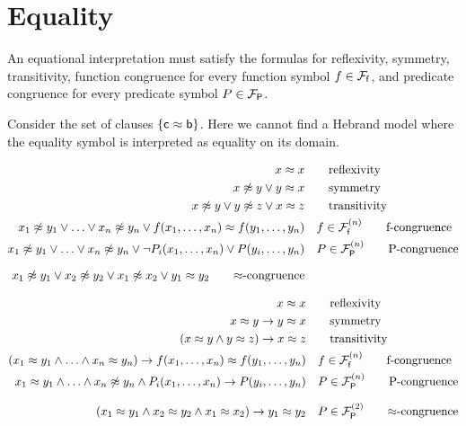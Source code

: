 \section{Equality}



	An equational interpretation must satisfy the formulas for reflexivity, symmetry, transitivity, 
	function congruence for every function symbol $f\in{{\mathcal F}_{\mathsf f}}$, 
	and predicate congruence for every predicate symbol $P\in{{\mathcal F}_{\mathsf P}}$.

%

\begin{example}
	Consider the set of clauses $\{ {\mathsf c} \approx {\mathsf b} \}$. Here we cannot find a Hebrand model where the equality symbol is interpreted as equality on its domain.
\end{example}

\begin{align*}
	 x \mEQ x & \tag*{reflexivity} \\
	x \mNE y \lor y \mEQ x & \tag*{symmetry}\\
	x\mNE y\lor y\mNE z\lor x\mEQ z & \tag*{transitivity} \\
	x_1 \mNE y_1\lor\ldots\lor x_n \mNE y_n\lor f(x_1,\ldots,x_n)\mEQ f(y_1,\ldots,y_n) &\quad f\in\mcFfn
	\tag*{f-congruence}
	\\
	x_1\mNE y_1\lor\ldots\lor x_n\mNE y_n\lor\lnot P_i(x_1,\ldots,x_n)\lor P(y_i,\ldots,y_n) &\quad P\in\mcFPn
	\tag*{P-congruence}
	\\[0.7em]
	x_1\mNE y_1\lor x_2\mNE y_2
	\lor x_1\mNE x_2
	\lor y_1\mEQ y_2
	\tag*{$\mEQ$-congruence}
\end{align*}

\begin{align*}
	x \mEQ x & \tag*{reflexivity} 
	\\
	x \mEQ y \limp y \mEQ x & \tag*{symmetry}
	\\
	(x\mEQ y\land y\mEQ z)\limp x\mEQ z & \tag*{transitivity} 
	\\
	(x_1 \mEQ y_1\land\ldots\land x_n \mEQ y_n)\limp f(x_1,\ldots,x_n)\mEQ f(y_1,\ldots,y_n) &\quad f\in\mcFfn
	\tag*{f-congruence}
	\\
	x_1\mEQ y_1\land\ldots\land x_n\mNE y_n\land P_i(x_1,\ldots,x_n)
	\limp P(y_i,\ldots,y_n) &\quad P\in\mcFPn
	\tag*{P-congruence}
	\\[0.7em]
	(x_1\mEQ y_1
	\land x_2\mEQ y_2
	\land x_1\mEQ x_2)
	\limp y_1\mEQ y_2
	& \quad P\in\mcFPn[2]
		\tag*{$\mEQ$-congruence}
\end{align*}
	
